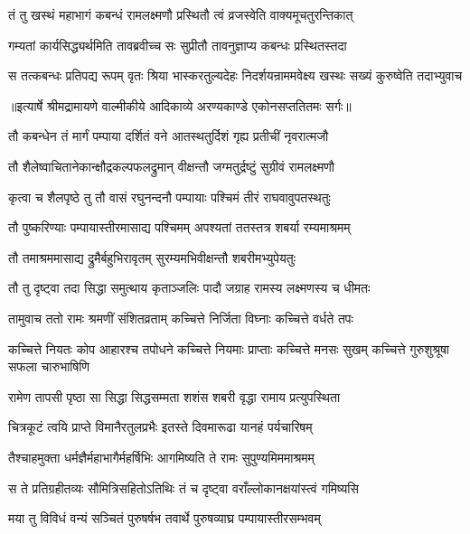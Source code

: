\twolineshloka
{तं तु खस्थं महाभागं कबन्धं रामलक्ष्मणौ}
{प्रस्थितौ त्वं व्रजस्वेति वाक्यमूचतुरन्तिकात्} %

\twolineshloka
{गम्यतां कार्यसिद्ध्यर्थमिति तावब्रवीच्च सः}
{सुप्रीतौ तावनुज्ञाप्य कबन्धः प्रस्थितस्तदा} %

\fourlineindentedshloka
{स तत्कबन्धः प्रतिपद्य रूपम्}
{वृतः श्रिया भास्करतुल्यदेहः}
{निदर्शयन्राममवेक्ष्य खस्थः}
{सख्यं कुरुष्वेति तदाभ्युवाच} %


{॥इत्यार्षे श्रीमद्रामायणे वाल्मीकीये आदिकाव्ये अरण्यकाण्डे एकोनसप्ततितमः सर्गः॥}


\twolineshloka
{तौ कबन्धेन तं मार्गं पम्पाया दर्शितं वने}
{आतस्थतुर्दिशं गृह्य प्रतीचीं नृवरात्मजौ} %

\twolineshloka
{तौ शैलेष्वाचितानेकान्क्षौद्रकल्पफलद्रुमान्}
{वीक्षन्तौ जग्मतुर्द्रष्टुं सुग्रीवं रामलक्ष्मणौ} %

\twolineshloka
{कृत्वा च शैलपृष्ठे तु तौ वासं रघुनन्दनौ}
{पम्पायाः पश्चिमं तीरं राघवावुपतस्थतुः} %

\twolineshloka
{तौ पुष्करिण्याः पम्पायास्तीरमासाद्य पश्चिमम्}
{अपश्यतां ततस्तत्र शबर्या रम्यमाश्रमम्} %

\twolineshloka
{तौ तमाश्रममासाद्य द्रुमैर्बहुभिरावृतम्}
{सुरम्यमभिवीक्षन्तौ शबरीमभ्युपेयतुः} %

\twolineshloka
{तौ तु दृष्ट्वा तदा सिद्धा समुत्थाय कृताञ्जलिः}
{पादौ जग्राह रामस्य लक्ष्मणस्य च धीमतः} %

\twolineshloka
{तामुवाच ततो रामः श्रमणीं संशितव्रताम्}
{कच्चित्ते निर्जिता विघ्नाः कच्चित्ते वर्धते तपः} %

\threelineshloka
{कच्चित्ते नियतः कोप आहारश्च तपोधने}
{कच्चित्ते नियमाः प्राप्ताः कच्चित्ते मनसः सुखम्}
{कच्चित्ते गुरुशुश्रूषा सफला चारुभाषिणि} %

\twolineshloka
{रामेण तापसी पृष्ठा सा सिद्धा सिद्धसम्मता}
{शशंस शबरी वृद्धा रामाय प्रत्युपस्थिता} %

\twolineshloka
{चित्रकूटं त्वयि प्राप्ते विमानैरतुलप्रभैः}
{इतस्ते दिवमारूढा यानहं पर्यचारिषम्} %

\twolineshloka
{तैश्चाहमुक्ता धर्मज्ञैर्महाभागैर्महर्षिभिः}
{आगमिष्यति ते रामः सुपुण्यमिममाश्रमम्} %

\twolineshloka
{स ते प्रतिग्रहीतव्यः सौमित्रिसहितोऽतिथिः}
{तं च दृष्ट्वा वराँल्लोकानक्षयांस्त्वं गमिष्यसि} %

\twolineshloka
{मया तु विविधं वन्यं सञ्चितं पुरुषर्षभ}
{तवार्थे पुरुषव्याघ्र पम्पायास्तीरसम्भवम्} %

